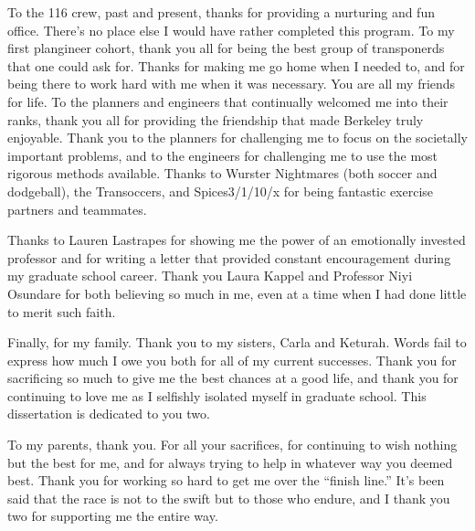 \documentclass{ucbthesis}
\begin{document}
\begin{frontmatter}
\begin{acknowledgements}
To the 116 crew, past and present, thanks for providing a nurturing and fun office. There's no place else I would have rather completed this program. To my first plangineer cohort, thank you all for being the best group of transponerds that one could ask for. Thanks for making me go home when I needed to, and for being there to work hard with me when it was necessary. You are all my friends for life. To the planners and engineers that continually welcomed me into their ranks, thank you all for providing the friendship that made Berkeley truly enjoyable. Thank you to the planners for challenging me to focus on the societally important problems, and to the engineers for challenging me to use the most rigorous methods available. Thanks to Wurster Nightmares (both soccer and dodgeball), the Transoccers, and Spices3/1/10/x for being fantastic exercise partners and teammates.

Thanks to Lauren Lastrapes for showing me the power of an emotionally invested professor and for writing a letter that provided constant encouragement during my graduate school career. Thank you Laura Kappel and Professor Niyi Osundare for both believing so much in me, even at a time when I had done little to merit such faith.

Finally, for my family. Thank you to my sisters, Carla and Keturah. Words fail to express how much I owe you both for all of my current successes. Thank you for sacrificing so much to give me the best chances at a good life, and thank you for continuing to love me as I selfishly isolated myself in graduate school. This dissertation is dedicated to you two.

To my parents, thank you. For all your sacrifices, for continuing to wish nothing but the best for me, and for always trying to help in whatever way you deemed best. Thank you for working so hard to get me over the ``finish line.'' It's been said that the race is not to the swift but to those who endure, and I thank you two for supporting me the entire way.

\end{acknowledgements}

\end{frontmatter}

\pagestyle{headings}


\end{document}
